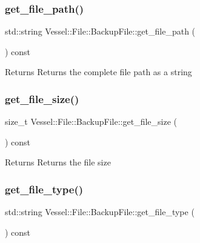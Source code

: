 \subsubsection{\texorpdfstring{get\+\_\+file\+\_\+path()}{get\_file\_path()}}
{\footnotesize\ttfamily std\+::string Vessel\+::\+File\+::\+Backup\+File\+::get\+\_\+file\+\_\+path (\begin{DoxyParamCaption}{ }\end{DoxyParamCaption}) const}

\begin{DoxyReturn}{Returns}
Returns the complete file path as a string 
\end{DoxyReturn}
\mbox{\label{class_vessel_1_1_file_1_1_backup_file_a0b803c1b83538be4cd6f8b68325ce040}} 
\subsubsection{\texorpdfstring{get\+\_\+file\+\_\+size()}{get\_file\_size()}}
{\footnotesize\ttfamily size\+\_\+t Vessel\+::\+File\+::\+Backup\+File\+::get\+\_\+file\+\_\+size (\begin{DoxyParamCaption}{ }\end{DoxyParamCaption}) const}

\begin{DoxyReturn}{Returns}
Returns the file size 
\end{DoxyReturn}
\mbox{\label{class_vessel_1_1_file_1_1_backup_file_ac8c6bd1d97350bfff857a4d2ac66a705}} 
\subsubsection{\texorpdfstring{get\+\_\+file\+\_\+type()}{get\_file\_type()}}
{\footnotesize\ttfamily std\+::string Vessel\+::\+File\+::\+Backup\+File\+::get\+\_\+file\+\_\+type (\begin{DoxyParamCaption}{ }\end{DoxyParamCaption}) const}


